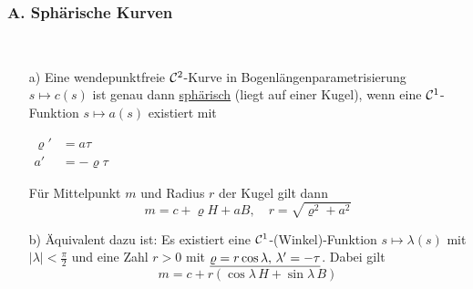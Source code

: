 \subsubsection{A. Sphärische Kurven}
\begin{satz}\label{satz1310}\(\)
 \begin{enumerate}
  \item[a)] Eine wendepunktfreie \(\mathcal{C}^2\)-Kurve in Bogenlängenparametrisierung \(s \mapsto c(s)\) ist genau dann \uline{sphärisch} (liegt auf einer Kugel), wenn eine \(\mathcal{C}^1\)-Funktion \(s \mapsto a(s)\) existiert mit
  \begin{center}\(\boxed{\begin{aligned}
   \varrho' &= a \tau \\
   a' &= -\varrho \tau
  \end{aligned}}\)\end{center}
  Für Mittelpunkt \(m\) und Radius \(r\) der Kugel gilt dann
  \[
   m = c + \varrho H + a B, \quad r = \sqrt{\varrho^2 + a^2}
  \]
  \item[b)] Äquivalent dazu ist: Es existiert eine \(\mathcal{C}^1\)-(Winkel)-Funktion \(s \mapsto \lambda (s)\) mit \(|\lambda| < \frac{\pi}{2}\) und eine Zahl \(r > 0\) mit \(\uline{\varrho = r \cos \lambda, \, \lambda' = -\tau}\). Dabei gilt
  \[
   m = c + r (\cos \lambda \, H + \sin \lambda \, B)
  \]
 \end{enumerate}

\end{satz}

